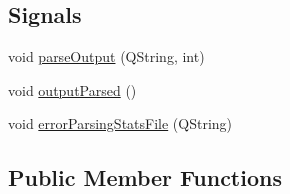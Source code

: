 \subsection*{Signals}
\begin{DoxyCompactItemize}
\item 
void \mbox{\hyperlink{class_displace_model_aadb6e19202fc881ee5490f3e78e7c1b0}{parse\+Output}} (Q\+String, int)
\item 
void \mbox{\hyperlink{class_displace_model_a0c20da595cd366606c388b5895a5c81a}{output\+Parsed}} ()
\item 
void \mbox{\hyperlink{class_displace_model_ae90a55f14f27a1492e64a6ba2fb5bb68}{error\+Parsing\+Stats\+File}} (Q\+String)
\end{DoxyCompactItemize}
\subsection*{Public Member Functions}
